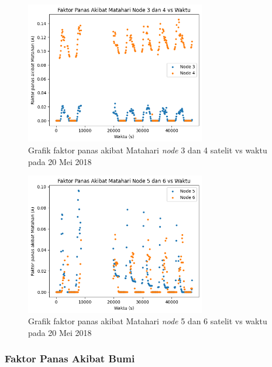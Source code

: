 \begin{figure}[H]
\setlength{}
\begin{center}
\includegraphics[width=0.7\textwidth]{fig/solar_node34_2018-05-20.png}
	\caption{Grafik faktor panas akibat Matahari \textit{node} 3 dan 4 satelit vs waktu pada 20 Mei 2018}
\label{fig:solar3420}
\end{center}
\end{figure}

\begin{figure}[H]
\setlength{}
\begin{center}
\includegraphics[width=0.7\textwidth]{fig/solar_node56_2018-05-20.png}
	\caption{Grafik faktor panas akibat Matahari \textit{node} 5 dan 6 satelit vs waktu pada 20 Mei 2018}
\label{fig:solar5620}
\end{center}
\end{figure}

\subsubsection{Faktor Panas Akibat Bumi}

